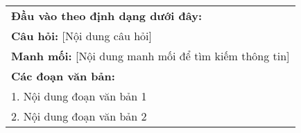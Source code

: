 \begin{table}[ht]
{\begin{tabular}{p{}}
            \textbf{Đầu vào theo định dạng dưới đây:}                                                                                                                                                                                                                                                                                                                                                    \\
            \textbf{Câu hỏi:} [Nội dung câu hỏi]                                                                                                                                                                                                                                                                                                                                                         \\
            \textbf{Manh mối:} [Nội dung manh mối để tìm kiếm thông tin]                                                                                                                                                                                                                                                                                                                                 \\
            \textbf{Các đoạn văn bản:}                                                                                                                                                                                                                                                                                                                                                                   \\
            \hspace{1cm}1. Nội dung đoạn văn bản 1                                                                                                                                                                                                                                                                                                                                                       \\
            \hspace{1cm}2. Nội dung đoạn văn bản 2                                                                                                                                                                                                                                                                                                                                                       \\

\end{tabular}}
\end{table}
